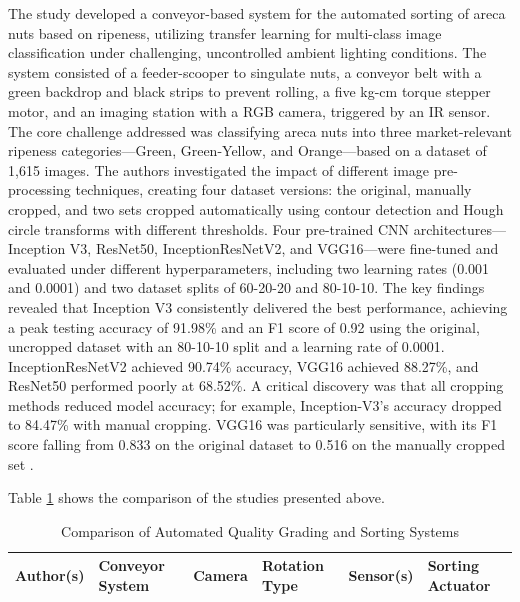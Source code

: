 {
The study developed a conveyor-based system for the automated sorting of areca nuts based on ripeness, utilizing transfer learning for multi-class image classification under challenging, uncontrolled ambient lighting conditions. The system consisted of a feeder-scooper to singulate nuts, a conveyor belt with a green backdrop and black strips to prevent rolling, a five kg-cm torque stepper motor, and an imaging station with a RGB camera, triggered by an IR sensor. The core challenge addressed was classifying areca nuts into three market-relevant ripeness categories—Green, Green-Yellow, and Orange—based on a dataset of 1,615 images. The authors investigated the impact of different image pre-processing techniques, creating four dataset versions: the original, manually cropped, and two sets cropped automatically using contour detection and Hough circle transforms with different thresholds. Four pre-trained CNN architectures—Inception V3, ResNet50, InceptionResNetV2, and VGG16—were fine-tuned and evaluated under different hyperparameters, including two learning rates (0.001 and 0.0001) and two dataset splits of 60-20-20 and 80-10-10. The key findings revealed that Inception V3 consistently delivered the best performance, achieving a peak testing accuracy of 91.98\% and an F1 score of 0.92 using the original, uncropped dataset with an 80-10-10 split and a learning rate of 0.0001. InceptionResNetV2 achieved 90.74\% accuracy, VGG16 achieved 88.27\%, and ResNet50 performed poorly at 68.52\%. A critical discovery was that all cropping methods reduced model accuracy; for example, Inception-V3’s accuracy dropped to 84.47\% with manual cropping. VGG16 was particularly sensitive, with its F1 score falling from 0.833 on the original dataset to 0.516 on the manually cropped set \citep{kumar2024transfer}.

Table \ref{tab:relatedstudies_one} shows the comparison of the studies presented above.

\begin{table}
	\centering
	\caption{Comparison of Automated Quality Grading and Sorting Systems}
	\label{tab:relatedstudies_one}
	\begin{tabular}{
			>{\centering\arraybackslash}m{2cm} 
			>{\centering\arraybackslash}m{3cm}   
			>{\centering\arraybackslash}m{1.5cm} 
			>{\centering\arraybackslash}m{3cm}    
			>{\centering\arraybackslash}m{3cm}  
			>{\centering\arraybackslash}m{4cm}  
		}
		\toprule
		\textbf{Author(s)} & \textbf{Conveyor System} & \textbf{Camera} & \textbf{Rotation Type} & \textbf{Sensor(s)} & \textbf{Sorting Actuator} \\
		\midrule
		

\end{tabular}
\end{table}}
